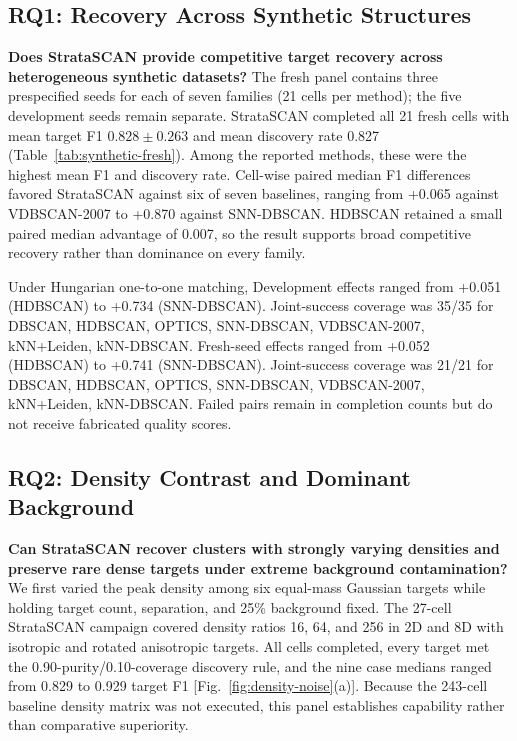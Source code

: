 \documentclass[conference]{IEEEtran}
\begin{document}
\subsection{RQ1: Recovery Across Synthetic Structures}
\textbf{Does StrataSCAN provide competitive target recovery across heterogeneous synthetic datasets?}
The fresh panel contains three prespecified seeds for each of seven families (21 cells per method); the five development seeds remain separate. StrataSCAN completed all 21 fresh cells with mean target F1 $0.828\pm0.263$ and mean discovery rate 0.827 (Table~\ref{tab:synthetic-fresh}). Among the reported methods, these were the highest mean F1 and discovery rate. Cell-wise paired median F1 differences favored StrataSCAN against six of seven baselines, ranging from +0.065 against VDBSCAN-2007 to +0.870 against SNN-DBSCAN. HDBSCAN retained a small paired median advantage of 0.007, so the result supports broad competitive recovery rather than dominance on every family.



Under Hungarian one-to-one matching, Development effects ranged from +0.051 (HDBSCAN) to +0.734 (SNN-DBSCAN). Joint-success coverage was 35/35 for DBSCAN, HDBSCAN, OPTICS, SNN-DBSCAN, VDBSCAN-2007, kNN+Leiden, kNN-DBSCAN. Fresh-seed effects ranged from +0.052 (HDBSCAN) to +0.741 (SNN-DBSCAN). Joint-success coverage was 21/21 for DBSCAN, HDBSCAN, OPTICS, SNN-DBSCAN, VDBSCAN-2007, kNN+Leiden, kNN-DBSCAN. Failed pairs remain in completion counts but do not receive fabricated quality scores.

\subsection{RQ2: Density Contrast and Dominant Background}
\textbf{Can StrataSCAN recover clusters with strongly varying densities and preserve rare dense targets under extreme background contamination?}
We first varied the peak density among six equal-mass Gaussian targets while holding target count, separation, and 25\% background fixed. The 27-cell StrataSCAN campaign covered density ratios 16, 64, and 256 in 2D and 8D with isotropic and rotated anisotropic targets. All cells completed, every target met the 0.90-purity/0.10-coverage discovery rule, and the nine case medians ranged from 0.829 to 0.929 target F1 [Fig.~\ref{fig:density-noise}(a)]. Because the 243-cell baseline density matrix was not executed, this panel establishes capability rather than comparative superiority.
\end{document}

